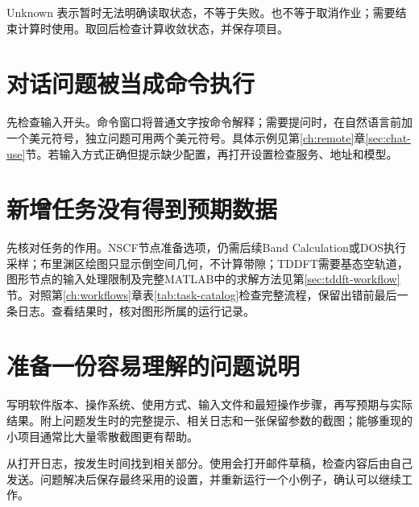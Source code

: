 Unknown 表示暂时无法明确读取状态，不等于失败。也不等于取消作业；需要结束计算时使用。取回后检查计算收敛状态，并保存项目。

\section{对话问题被当成命令执行}

先检查输入开头。命令窗口将普通文字按命令解释；需要提问时，在自然语言前加一个美元符号，独立问题可用两个美元符号。具体示例见第\ref{ch:remote}章\ref{sec:chat-use}节。若输入方式正确但提示缺少配置，再打开设置检查服务、地址和模型。

\section{新增任务没有得到预期数据}

先核对任务的作用。NSCF节点准备选项，仍需后续Band Calculation或DOS执行采样；布里渊区绘图只显示倒空间几何，不计算带隙；TDDFT需要基态空轨道，图形节点的输入处理限制及完整MATLAB\regmark{}中的求解方法见第\ref{sec:tddft-workflow}节。对照第\ref{ch:workflows}章表\ref{tab:task-catalog}检查完整流程，保留出错前最后一条日志。查看结果时，核对图形所属的运行记录。


\section{准备一份容易理解的问题说明}

写明软件版本、操作系统、使用方式、输入文件和最短操作步骤，再写预期与实际结果。附上问题发生时的完整提示、相关日志和一张保留参数的截图；能够重现的小项目通常比大量零散截图更有帮助。

从打开日志，按发生时间找到相关部分。使用会打开邮件草稿，检查内容后由自己发送。问题解决后保存最终采用的设置，并重新运行一个小例子，确认可以继续工作。
